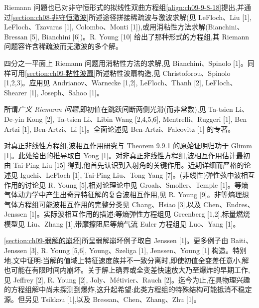 \documentclass[../../main.tex]{subfiles}
\begin{document}
Riemann 问题也已对非守恒形式的拟线性双曲方程组\eqref{align:ch09-9-8-18}提出,并通过\cref{section:ch08-非守恒激波}所述途径拼接稀疏波与激波求解(见 LeFloch、Liu [1], LeFloch、Tzavaras [1], Colombo、Monti [1]),或用消粘性方法求解(Bianchini、Bressan [5], Bianchini [6])。R. Young [10] 给出了那种形式的方程组,其 Riemann 问题容许含稀疏波而无激波的多个解。

四分之一平面上 Riemann 问题用消粘性方法的求解,见 Bianchini、Spinolo [1]。同样可用\cref{section:ch09-粘性波扇}所述粘性波扇构造,见 Christoforou、Spinolo [1,2,3]。应用见 Andrianov、Warnecke [1,2], LeFloch、Thanh [2], LeFloch、Shearer [1], Joseph、Sahoo [1]。

所谓\emph{广义 Riemann 问题},即初值在跳跃间断两侧光滑(而非常数),见 Ta-tsien Li、De-yin Kong [2], Ta-tsien Li、Libin Wang [2,4,5,6], Mentrelli、Ruggeri [1], Ben Artzi [1], Ben-Artzi、Li [1]。全面论述见 Ben-Artzi、Falcovitz [1] 的专著。

对真正非线性方程组,波相互作用研究与 Theorem 9.9.1 的原始证明归功于 Glimm [1]。此处给出的推导取自 Yong [1]。对非真正非线性方程组,波相互作用估计最初由 Tai-Ping Liu [15] 得到,他首先认识到入射角的关键作用。近期详细而严格的论述见 Iguchi、LeFloch [1], Tai-Ping Liu、Tong Yang [7]。(非线性)弹性弦中波相互作用的讨论见 R. Young [5],相对论理论中见 Groah、Smoller、Temple [1]。等熵气体动力学中产生出奇异特征解的复合波相互作用,见 R. Young [9]。非等熵理想气体方程组可能波相互作用的完整分类见 Chang、Hsiao [3],以及 Chen、Endres、Jenssen [1]。实际波相互作用的描述:等熵弹性方程组见 Greenberg [1,2],标量燃烧模型见 Liu、Zhang [1],带摩擦阻尼等熵气流 Euler 方程组见 Luo、Yang [1]。

\cref{section:ch09-弱解的崩坏}所呈弱解崩坏例子取自 Jenssen [1]。更多例子由 Baiti、Jenssen [3], R. Young [5,6], Young、Szeliga [1], Jenssen、Young [1] 构造。特别地,文中证明:当解的值域上特征速度族并不一致分离时,即使初值全变差任意小,解也可能在有限时间内崩坏。关于解上确界或全变差快速放大乃至爆炸的早期工作,见 Jeffrey [2], R. Young [2], Joly、Métivier、Rauch [2]。迄今为止,在具物理兴趣的方程组解中尚未探测到爆炸,这升起希望:此类方程组的特殊结构可能抵消不稳定源。但另见 Tsikkou [1],以及 Bressan、Chen、Zhang、Zhu [1]。
\end{document}
